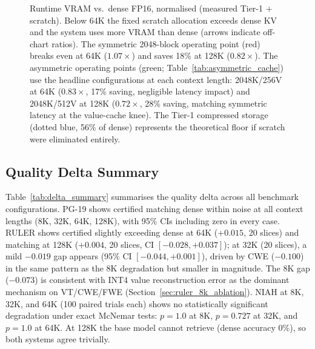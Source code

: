 \documentclass[10pt,twocolumn,a4paper]{article}
\theoremstyle{definition}
\theoremstyle{remark}
\begin{document}
\begin{figure}[!t]
\caption{Runtime VRAM vs.\ dense FP16, normalised (measured Tier-1 + scratch).  Below 64K the fixed scratch allocation exceeds dense KV and the system uses more VRAM than dense (arrows indicate off-chart ratios).  The symmetric 2048-block operating point (red) breaks even at 64K ($1.07\times$) and saves 18\% at 128K ($0.82\times$).  The asymmetric operating points (green; Table~\ref{tab:asymmetric_cache}) use the headline configurations at each context length: 2048K/256V at 64K ($0.83\times$, 17\% saving, negligible latency impact) and 2048K/512V at 128K ($0.72\times$, 28\% saving, matching symmetric latency at the value-cache knee).  The Tier-1 compressed storage (dotted blue, 56\% of dense) represents the theoretical floor if scratch were eliminated entirely.}
\label{fig:vram_scaling}
\end{figure}

\subsection{Quality Delta Summary}

Table~\ref{tab:delta_summary} summarises the quality delta across all benchmark configurations.  PG-19 shows certified matching dense within noise at all context lengths (8K, 32K, 64K, 128K), with 95\% CIs including zero in every case.  RULER shows certified slightly exceeding dense at 64K ($+0.015$, 20 slices) and matching at 128K ($+0.004$, 20 slices, CI $[-0.028, +0.037]$); at 32K (20 slices), a mild $-0.019$ gap appears (95\% CI $[-0.044, +0.001]$), driven by CWE ($-0.100$) in the same pattern as the 8K degradation but smaller in magnitude.  The 8K gap ($-0.073$) is consistent with INT4 value reconstruction error as the dominant mechanism on VT/CWE/FWE (Section~\ref{sec:ruler_8k_ablation}).  NIAH at 8K, 32K, and 64K (100 paired trials each) shows no statistically significant degradation under exact McNemar tests: $p{=}1.0$ at 8K, $p{=}0.727$ at 32K, and $p{=}1.0$ at 64K.  At 128K the base model cannot retrieve (dense accuracy 0\%), so both systems agree trivially.
\end{document}
